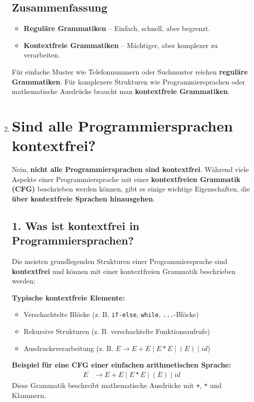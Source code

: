 \documentclass[a4paper,12pt]{article}
\begin{document}
\begin{enumerate}
		\subsection*{Zusammenfassung}
		\begin{itemize}
			\item \textbf{Reguläre Grammatiken} – Einfach, schnell, aber begrenzt.
			\item \textbf{Kontextfreie Grammatiken} – Mächtiger, aber komplexer zu verarbeiten.
		\end{itemize}
		
		Für einfache Muster wie Telefonnummern oder Suchmuster reichen \textbf{reguläre Grammatiken}. Für komplexere Strukturen wie Programmiersprachen oder mathematische Ausdrücke braucht man \textbf{kontextfreie Grammatiken}.
				\item \section*{Sind alle Programmiersprachen kontextfrei?}
		
		Nein, \textbf{nicht alle Programmiersprachen sind kontextfrei}. Während viele Aspekte einer Programmiersprache mit einer \textbf{kontextfreien Grammatik (CFG)} beschrieben werden können, gibt es einige wichtige Eigenschaften, die \textbf{über kontextfreie Sprachen hinausgehen}.
		
		\subsection*{1. Was ist kontextfrei in Programmiersprachen?}
		Die meisten grundlegenden Strukturen einer Programmiersprache sind \textbf{kontextfrei} und können mit einer kontextfreien Grammatik beschrieben werden:
		
		\textbf{Typische kontextfreie Elemente:}
		\begin{itemize}
			\item Verschachtelte Blöcke (z. B. \texttt{if-else}, \texttt{while}, \texttt{{}...{}}-Blöcke)
			\item Rekursive Strukturen (z. B. verschachtelte Funktionsaufrufe)
			\item Ausdrucksverarbeitung (z. B. $E \rightarrow E + E \mid E * E \mid (E) \mid id$)
		\end{itemize}
		
		\textbf{Beispiel für eine CFG einer einfachen arithmetischen Sprache:}
		\begin{align*}
			E &\rightarrow E + E \mid E * E \mid (E) \mid id
		\end{align*}
		Diese Grammatik beschreibt mathematische Ausdrücke mit \texttt{+}, \texttt{*} und Klammern.
		

\end{enumerate}
\end{document}
